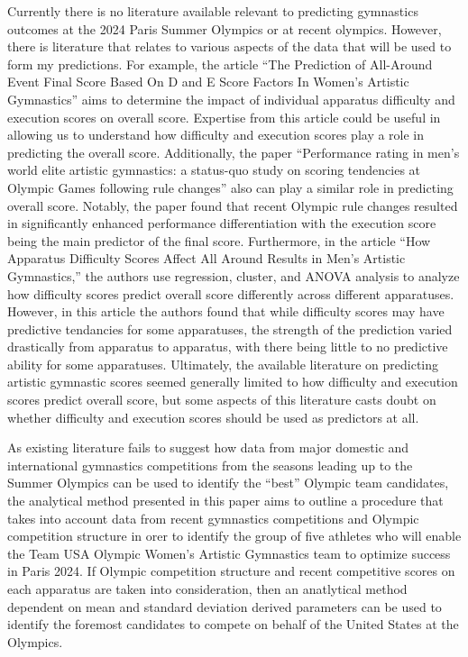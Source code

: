 \documentclass[12pt]{article}
\begin{document}
Currently there is no literature available relevant to predicting gymnastics outcomes at the 2024 
Paris Summer Olympics or at recent olympics. However, there is literature that relates to various aspects of 
the data that will be used to form my predictions. For example, the article ``The Prediction of All-Around 
Event Final Score Based On D and E Score Factors In Women's Artistic Gymnastics'' aims to determine the 
impact of individual apparatus difficulty and execution scores on overall score. 
Expertise from this article could be useful in allowing us to understand how difficulty and execution scores 
play a role in predicting the overall score. Additionally, the paper 
``Performance rating in men’s world elite artistic gymnastics: a status-quo study on scoring 
tendencies at Olympic Games following rule changes'' also can play a similar role in predicting overall 
score. Notably, the paper found that recent Olympic rule changes resulted in significantly enhanced performance 
differentiation with the execution score being the main predictor of the final score. 
Furthermore, in the article ``How Apparatus Difficulty Scores Affect All 
Around Results in Men's Artistic Gymnastics,'' the authors use regression, cluster, and ANOVA analysis to 
analyze how difficulty scores predict overall score differently across different apparatuses. However, in this 
article the authors found that while difficulty scores may have predictive tendancies for some apparatuses, 
the strength of the prediction varied drastically from apparatus to apparatus, with there being little to no 
predictive ability for some apparatuses. Ultimately, the available literature on predicting artistic 
gymnastic scores seemed generally limited to how difficulty and execution scores predict overall score, 
but some aspects of this literature casts doubt on whether difficulty and execution scores should be 
used as predictors at all.



As existing literature fails to suggest how data from major domestic and international gymnastics competitions 
from the seasons leading up to the Summer Olympics can be used to identify the ``best'' Olympic team candidates, 
the analytical method presented in this paper aims to outline a procedure that takes into account data from recent 
gymnastics competitions and Olympic competition structure in orer to identify the group of five athletes who will 
enable the Team USA Olympic Women’s Artistic Gymnastics team to optimize success in Paris 2024. If Olympic 
competition structure and recent competitive scores on each apparatus are taken into consideration, then an 
anatlytical method dependent on mean and standard deviation derived parameters can be used to identify the foremost 
candidates to compete on behalf of the United States at the Olympics.
\end{document}
